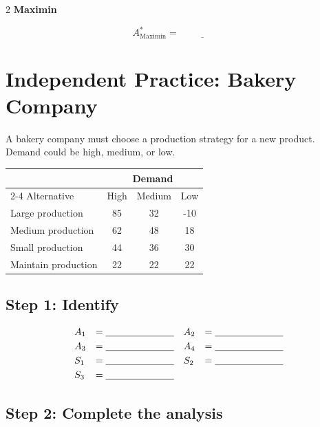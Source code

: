 \begin{multicols}{2}
		\textbf{Maximin}
		
		\[
		A^*_{\mathrm{Maximin}}
		=\underline{\hspace{2cm}}
		\]
		
		\section{Independent Practice: Bakery Company}
		
		A bakery company must choose a production strategy for a new product.
		Demand could be high, medium, or low.
		
		\begin{center}
			\renewcommand{\arraystretch}{1.3}
			\small
			\begin{tabular}{lccc}
				\toprule
				& \multicolumn{3}{c}{Demand} \\
				\cmidrule(lr){2-4}
				Alternative & High & Medium & Low \\
				\midrule
				Large production  & 85 & 32 & -10 \\
				Medium production & 62 & 48 & 18 \\
				Small production  & 44 & 36 & 30 \\
				Maintain production & 22 & 22 & 22 \\
				\bottomrule
			\end{tabular}
		\end{center}
		\subsection*{Step 1: Identify}
		
		\[
		\begin{array}{llll}
			A_1 &= \underline{\hspace{2.5cm}} &
			A_2 &= \underline{\hspace{2.5cm}} \\[3pt]
			A_3 &= \underline{\hspace{2.5cm}} &
			A_4 &= \underline{\hspace{2.5cm}} \\[3pt]
			S_1 &= \underline{\hspace{2.5cm}} &
			S_2 &= \underline{\hspace{2.5cm}} \\[3pt]
			S_3 &= \underline{\hspace{2.5cm}} &
			&
		\end{array}
		\]
		
		\subsection*{Step 2: Complete the analysis}
		

\end{multicols}
